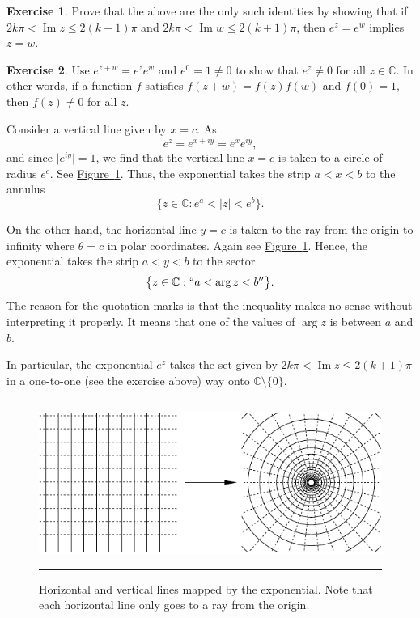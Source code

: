 \documentclass[12pt,openany]{book}
\renewcommand{\Im}{\operatorname{Im}}
\newcommand{\sabs}[1]{\lvert {#1} \rvert}
\newcommand{\C}{{\mathbb{C}}}
\theoremstyle{plain}
\theoremstyle{remark}
\theoremstyle{definition}
\newenvironment{exbox}{%
    \def\FrameCommand{\vrule width 1pt \relax\hspace{10pt}}%
    \MakeFramed{\advance\hsize-\width\FrameRestore}%
}{%
    \endMakeFramed
}
\newenvironment{myfig}{%
\begin{figure}[h!t]
\noindent\rule{\textwidth}{0.4pt}\vspace{12pt}\par\centering}%
{\par\noindent\rule{\textwidth}{0.4pt}
\end{figure}}
\theoremstyle{exercise}
\newtheorem{exercise}{Exercise}[section]
\theoremstyle{example}
\newcommand{\figureref}[1]{\hyperref[#1]{Figure~\ref*{#1}}}
\begin{document}
\begin{exbox}
\begin{exercise}
Prove that the above are the only such identities by
showing that if $2k\pi < \Im z \leq 2(k+1)\pi$ and
$2k\pi < \Im w \leq 2(k+1)\pi$, then $e^z=e^w$ implies $z=w$.
\end{exercise}

\begin{exercise}
Use $e^{z+w} = e^z e^w$ and $e^0 = 1 \not= 0$ to show that $e^z \not=0$ for all
$z \in \C$.  In other words, if a function $f$ satisfies $f(z+w)=f(z)f(w)$
and $f(0) = 1$, then $f(z) \not= 0$ for all $z$.
\end{exercise}
\end{exbox}

Consider a vertical line given by $x=c$.  As
\begin{equation*}
e^{z} = 
e^{x+iy} =
e^x e^{iy} ,
\end{equation*}
and since $\sabs{e^{iy}} =1$, we find that the vertical line $x=c$ is taken to a
circle of radius $e^c$.  See \figureref{fig:expplotlines}.
Thus, the exponential takes the strip $a < x < b$ to the
annulus
\begin{equation*}
\bigl\{ z \in \C : e^a < \sabs{z} < e^b \bigr\} .
\end{equation*}

On the other hand, the horizontal line $y=c$
is taken to the ray from the origin to infinity where $\theta = c$ in polar
coordinates.  Again see \figureref{fig:expplotlines}.
Hence, the exponential takes the strip $a < y < b$ to the
sector
\begin{equation*}
\bigl\{ z \in \C : ``a < \arg z < b'' \bigr\} .
\end{equation*}
The reason for the quotation marks is that the inequality makes no
sense without interpreting it properly.  It means that one of the values
of $\arg z$ is between $a$ and $b$.

In particular, the exponential $e^z$ takes the set given by
$2k\pi < \Im z \leq 2(k+1)\pi$ in a one-to-one (see the exercise above)
way onto $\C \setminus \{ 0 \}$.

\begin{myfig}
\includegraphics{figures/expplotlines}
\caption{Horizontal and vertical lines mapped by the exponential.  Note that
each horizontal line only goes to a ray from the
origin.\label{fig:expplotlines}}
\end{myfig}
\end{document}
